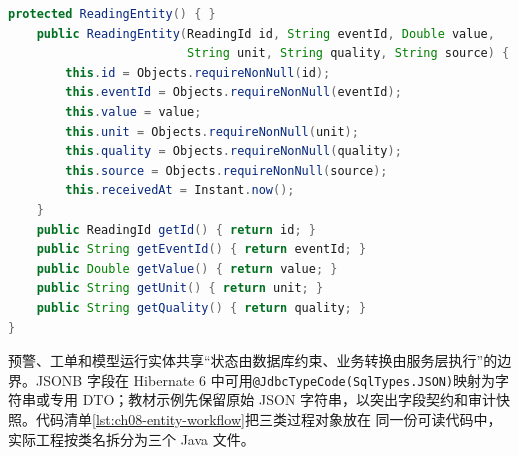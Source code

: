 \begin{lstlisting}[label={lst:ch08-entity-reading},language=Java,caption={ReadingEntity 与复合主键}]
    protected ReadingEntity() { }
    public ReadingEntity(ReadingId id, String eventId, Double value,
                         String unit, String quality, String source) {
        this.id = Objects.requireNonNull(id);
        this.eventId = Objects.requireNonNull(eventId);
        this.value = value;
        this.unit = Objects.requireNonNull(unit);
        this.quality = Objects.requireNonNull(quality);
        this.source = Objects.requireNonNull(source);
        this.receivedAt = Instant.now();
    }
    public ReadingId getId() { return id; }
    public String getEventId() { return eventId; }
    public Double getValue() { return value; }
    public String getUnit() { return unit; }
    public String getQuality() { return quality; }
}
\end{lstlisting}

预警、工单和模型运行实体共享“状态由数据库约束、业务转换由服务层执行”的边界。JSONB 字段在
Hibernate 6 中可用\texttt{@JdbcTypeCode(SqlTypes.JSON)}映射为字符串或专用 DTO；教材示例先保留原始
JSON 字符串，以突出字段契约和审计快照。代码清单\ref{lst:ch08-entity-workflow}把三类过程对象放在
同一份可读代码中，实际工程按类名拆分为三个 Java 文件。

